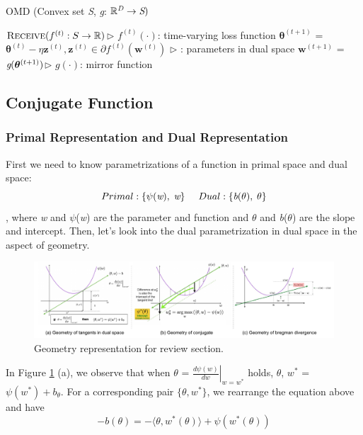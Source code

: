 \documentclass[11pt]{article}
\begin{document}
\begin{algorithm}[H]
\caption{OMD (Convex set \emph{S}, \emph{g}: $\mathbb{R}^\emph{D} \rightarrow \emph{S})$}
\label{algo:omd}
\begin{algorithmic}[1]

\STATE $\textsc{Receive} (f^{(t)}: S\rightarrow \mathbb{R})$\hfill $\triangleright$ $f^{(t)}(\cdot)$: time-varying loss function
\STATE $\bm{\theta}^{(t+1)}$ = $\bm{\theta}^{(t)} - \eta\bm{z}^{(t)}, \bm{z}^{(t)} \in \partial f^{(t)}(\bm{w}^{(t)})$ \hfill  $\triangleright$ \bm{$\theta$}: parameters in dual space
\STATE $\bm{w}^{(t+1)}$ = $\emph{g}(\bm{\theta}^{(t+1)})$\hfill $\triangleright$  $g(\cdot)$: mirror function

\ENDFOR
\end{algorithmic}
\end{algorithm}
\vspace{-3mm}
\subsection{Conjugate Function}
\subsubsection{Primal Representation and Dual Representation}
First we need to know parametrizations of a function in primal space and dual space:
$$
    Primal: \{\psi(\emph{w}),\; \emph{w}\} \;\;\;\;\;  Dual: \{\emph{b}(\emph{$\theta$}),\; \emph{$\theta$}\}
$$
, where \emph{w} and $\psi$(\emph{w}) are the parameter and function and \emph{$\theta$} and \emph{b}(\emph{$\theta$}) are the slope and intercept. Then, let's look into the dual parametrization in dual space in the aspect of geometry.

\begin{figure}
    \centering
    \includegraphics[width=1.\textwidth]{images/review.pdf}
    \caption{Geometry representation for review section.}
    \label{fig:review}
\end{figure}

In Figure \ref{fig:review} (a), we observe that when $\theta$ = $\left.\frac{d\psi(w)}{dw}\right|_{w=w^*}$ holds, \big \langle $\theta$, $w^*$ \big \rangle = $\psi(w^*) + b_\theta$. For a corresponding pair $\{\theta, w^*\}$, we rearrange the equation above and have
$$
-b(\theta) = - \big \langle \theta, w^*(\theta) \big \rangle + \psi(w^*(\theta))
$$
\end{document}
